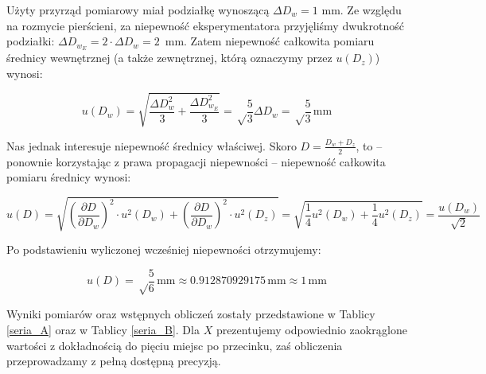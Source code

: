 \documentclass[a4paper]{article}
\newlength{\du}
\begin{document}
Użyty przyrząd pomiarowy miał podziałkę wynoszącą $\Delta D_w = 1$ mm.
Ze względu na rozmycie pierścieni, za niepewność eksperymentatora przyjęliśmy dwukrotność podziałki: $\Delta D_{w_E} = 2 \cdot \Delta D_w = 2$~mm.
Zatem niepewność całkowita pomiaru średnicy wewnętrznej (a także zewnętrznej, którą oznaczymy przez $u(D_z)$) wynosi:

$$u(D_w) = \sqrt{\frac{\Delta D_w^2}{3} + \frac{\Delta D_{w_E}^2}{3}} = \sqrt \frac{5}{3} \Delta D_w = \sqrt \frac{5}{3} \, \text{mm}$$

Nas jednak interesuje niepewność średnicy właściwej.
Skoro $D = \frac {D_w + D_z}{2}$, to -- ponownie korzystając z prawa propagacji niepewności -- niepewność całkowita pomiaru średnicy wynosi:

$$u(D) = \sqrt{\left(\frac{\partial D}{\partial D_w}\right)^2 \cdot u^2(D_w) + \left(\frac{\partial D}{\partial D_w}\right)^2 \cdot u^2(D_z)} = \sqrt{\frac{1}{4} u^2(D_w) + \frac{1}{4} u^2(D_z)} = \frac{u(D_w)}{\sqrt{2}}$$

Po podstawieniu wyliczonej wcześniej niepewności otrzymujemy:

$$u(D) = \sqrt \frac{5}{6} \, \text{mm} \approx 0.912870929175 \, \text{mm} \approx 1 \, \text{mm}$$

Wyniki pomiarów oraz wstępnych obliczeń zostały przedstawione w Tablicy \ref{seria_A} oraz w Tablicy \ref{seria_B}.
Dla $X$ prezentujemy odpowiednio zaokrąglone wartości z dokładnością do pięciu miejsc po przecinku, zaś obliczenia przeprowadzamy z pełną dostępną precyzją.
\end{document}
